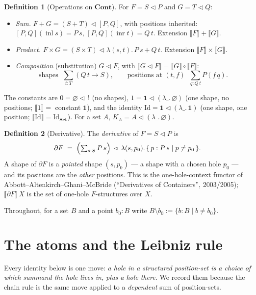 \documentclass[11pt]{article}
\theoremstyle{definition}
\newtheorem{definition}{Definition}
\newcommand{\Set}{\mathbf{Set}}
\newcommand{\Cont}{\mathbf{Cont}}
\newcommand{\ext}[1]{\llbracket #1 \rrbracket}
\newcommand{\tri}{\mathbin{\triangleleft}}
\newcommand{\pd}{\partial}
\DeclareMathOperator{\inl}{inl}
\DeclareMathOperator{\inr}{inr}
\begin{document}
\begin{definition}[Operations on $\Cont$]\label{def:ops}
For $F = S \tri P$ and $G = T \tri Q$:
\begin{itemize}
  \item \emph{Sum.} $F + G = (S + T) \tri [P,Q]$, with positions inherited:
  $[P,Q](\inl s) = P\,s$, $[P,Q](\inr t) = Q\,t$. Extension $\ext{F}+\ext{G}$.
  \item \emph{Product.} $F \times G = (S \times T) \tri \lambda(s,t).\, P\,s + Q\,t$.
  Extension $\ext{F}\times\ext{G}$.
  \item \emph{Composition} (substitution) $G \tri F$, with
  $\ext{G \tri F} = \ext{G} \circ \ext{F}$:
  \[
    \text{shapes } \;\textstyle\sum_{t:T} (Q\,t \to S),
    \qquad
    \text{positions at } (t,f) \;\;\textstyle\sum_{q : Q\,t} P(f\,q).
  \]
\end{itemize}
The constants are $0 = \varnothing \tri\, !$ (no shapes), $1 = \mathbf 1 \tri (\lambda\_.\,\varnothing)$
(one shape, no positions; $\ext{1} = $ constant $\mathbf 1$), and the identity
$\mathrm{Id} = \mathbf 1 \tri (\lambda\_.\,\mathbf 1)$ (one shape, one position;
$\ext{\mathrm{Id}} = \mathrm{Id}_\Set$). For a set $A$, $K_A = A \tri (\lambda\_.\,\varnothing)$.
\end{definition}

\begin{definition}[Derivative]\label{def:deriv}
The \emph{derivative} of $F = S \tri P$ is
\[
  \pd F \;=\; \Bigl(\textstyle\sum_{s:S} P\,s\Bigr) \;\tri\;
              \lambda(s,p_0).\,\{\,p : P\,s \mid p \neq p_0\,\}.
\]
A shape of $\pd F$ is a \emph{pointed} shape $(s, p_0)$ --- a shape with a chosen
hole $p_0$ --- and its positions are the \emph{other} positions. This is the
one-hole-context functor of Abbott--Altenkirch--Ghani--McBride (``Derivatives of
Containers'', 2003/2005); $\ext{\pd F}\,X$ is the set of one-hole $F$-structures
over $X$.
\end{definition}

Throughout, for a set $B$ and a point $b_0:B$ write $B \setminus b_0 := \{b:B \mid b \neq b_0\}$.

\section{The atoms and the Leibniz rule}

Every identity below is one move: \emph{a hole in a structured position-set is a
choice of which summand the hole lives in, plus a hole there.} We record them
because the chain rule is the same move applied to a \emph{dependent} sum of
position-sets.
\end{document}
